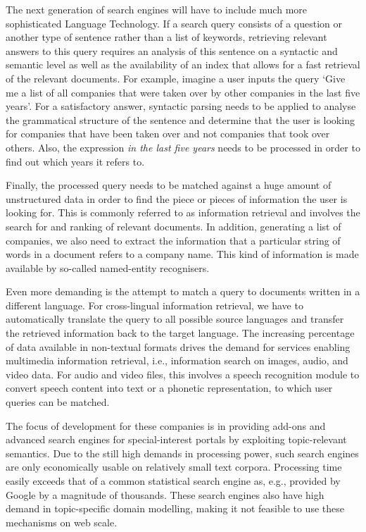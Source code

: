 \documentclass{scrartcl}
\begin{document}
\begin{Parallel}[c]{70mm}{70mm}
{    The next generation of search engines will have to include much more sophisticated Language Technology. If a search query consists of a question or another type of sentence rather than a list of keywords, retrieving relevant answers to this query requires an analysis of this sentence on a syntactic and semantic level as well as the availability of an index that allows for a fast retrieval of the relevant documents. For example, imagine a user inputs the query `Give me a list of all companies that were taken over by other companies in the last five years'. For a satisfactory answer, syntactic parsing needs to be applied to analyse the grammatical structure of the sentence and determine that the user is looking for companies that have been taken over and not companies that took over others. Also, the expression \emph{in the last five years} needs to be processed in order to find out which years it refers to.

    Finally, the processed query needs to be matched against a huge amount of unstructured data in order to find the piece or pieces of information the user is looking for. This is commonly referred to as information retrieval and involves the search for and ranking of relevant documents. In addition, generating a list of companies, we also need to extract the information that a particular string of words in a document refers to a company name. This kind of information is made available by so-called named-entity recognisers.

    Even more demanding is the attempt to match a query to documents written in a different language. For cross-lingual information retrieval, we have to automatically translate the query to all possible source languages and transfer the retrieved information back to the target language. The increasing percentage of data available in non-textual formats drives the demand for services enabling multimedia information retrieval, i.e., information search on images, audio, and video data. For audio and video files, this involves a speech recognition module to convert speech content into text or a phonetic representation, to which user queries can be matched.

   

    The focus of development for these companies is in providing add-ons and advanced search engines for special-interest portals by exploiting topic-relevant semantics. Due to the still high demands in processing power, such search engines are only economically usable on relatively small text corpora. Processing time easily exceeds that of a common statistical search engine as, e.g., provided by Google by a magnitude of thousands. These search engines also have high demand in topic-specific domain modelling, making it not feasible to use these mechanisms on web scale.

}
\end{Parallel}
\end{document}
